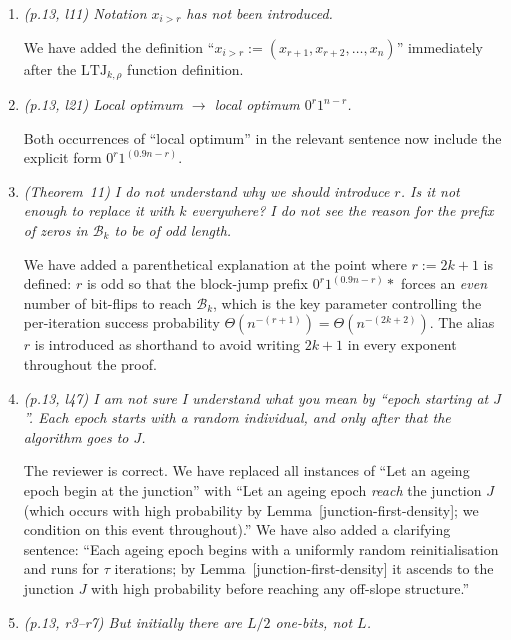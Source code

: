 \documentclass[11pt]{article}
\newcommand{\RC}[1]{\textcolor{revcolor}{\textit{#1}}}
\newcommand{\resp}[1]{\smallskip\noindent #1\medskip}
\begin{document}
\begin{enumerate}[label=\textbf{L\arabic*.},leftmargin=*]

\item \RC{(p.13, l11) Notation $x_{i>r}$ has not been introduced.}

\resp{We have added the definition
``$x_{i>r} := (x_{r+1}, x_{r+2}, \dots, x_n)$''
immediately after the $\mathrm{LTJ}_{k,\rho}$ function definition.}

\item \RC{(p.13, l21) Local optimum $\to$ local optimum $0^r 1^{n-r}$.}

\resp{Both occurrences of ``local optimum'' in the relevant sentence now include
the explicit form $0^{r}1^{(0.9n-r)}$.}

\item \RC{(Theorem~11) I do not understand why we should introduce $r$. Is it
not enough to replace it with $k$ everywhere? I do not see the reason for the
prefix of zeros in $\mathcal{B}_k$ to be of odd length.}

\resp{We have added a parenthetical explanation at the point where $r := 2k+1$
is defined: $r$ is odd so that the block-jump prefix
$0^r 1^{(0.9n-r)}\!\ast$ forces an \emph{even} number of bit-flips to reach
$\mathcal{B}_k$, which is the key parameter controlling the per-iteration
success probability $\Theta(n^{-(r+1)}) = \Theta(n^{-(2k+2)})$.
The alias $r$ is introduced as shorthand to avoid writing $2k+1$ in every
exponent throughout the proof.}

\item \RC{(p.13, l47) I am not sure I understand what you mean by ``epoch
starting at $J$''. Each epoch starts with a random individual, and only after
that the algorithm goes to $J$.}

\resp{The reviewer is correct. We have replaced all instances of ``Let an ageing
epoch begin at the junction'' with ``Let an ageing epoch \emph{reach} the
junction $J$ (which occurs with high probability by
Lemma~[junction-first-density]; we condition on this event throughout).''
We have also added a clarifying sentence: ``Each ageing epoch begins with a
uniformly random reinitialisation and runs for $\tau$ iterations; by
Lemma~[junction-first-density] it ascends to the junction $J$ with high
probability before reaching any off-slope structure.''}

\item \RC{(p.13, r3--r7) But initially there are $L/2$ one-bits, not $L$.}


\end{enumerate}
\end{document}
